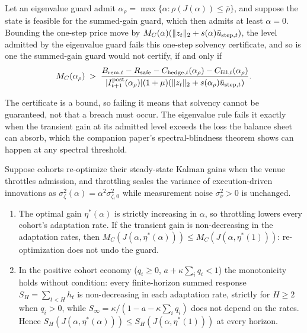 \begin{proposition}\label{prop:dominance}
Let an eigenvalue guard admit $\alpha_\rho=\max\{\alpha:\rho(J(\alpha))\le\bar\rho\}$, and suppose the state is feasible for the summed-gain guard, which then admits at least $\alpha=0$. Bounding the one-step price move by $M_C(\alpha)(\|z_t\|_2+s(\alpha)\bar u_{{\rm step},t})$, the level admitted by the eigenvalue guard fails this one-step solvency certificate, and so is one the summed-gain guard would not certify, if and only if
\[
M_C(\alpha_\rho)\;>\;\frac{B_{{\rm rem},t}-R_{\rm safe}-C_{{\rm hedge},t}(\alpha_\rho)-C_{{\rm fill},t}(\alpha_\rho)}{|I^{\rm post}_{t+1}(\alpha_\rho)|(1+\mu)(\|z_t\|_2+s(\alpha_\rho)\bar u_{{\rm step},t})} .
\]
\end{proposition}

The certificate is a bound, so failing it means that solvency cannot be guaranteed, not that a breach must occur. The eigenvalue rule fails it exactly when the transient gain at its admitted level exceeds the loss the balance sheet can absorb, which the companion paper's spectral-blindness theorem shows can happen at any spectral threshold.

\begin{proposition}\label{prop:lucas}
Suppose cohorts re-optimize their steady-state Kalman gains when the venue throttles admission, and throttling scales the variance of execution-driven innovations as $\sigma_\zeta^2(\alpha)=\alpha^2\sigma_{\zeta,0}^2$ while measurement noise $\sigma_\nu^2>0$ is unchanged.
\begin{enumerate}[label=(\roman*)]
\item The optimal gain $\eta^*(\alpha)$ is strictly increasing in $\alpha$, so throttling lowers every cohort's adaptation rate. If the transient gain is non-decreasing in the adaptation rates, then $M_C(J(\alpha,\eta^*(\alpha)))\le M_C(J(\alpha,\eta^*(1)))$: re-optimization does not undo the guard.
\item In the positive cohort economy ($q_i\ge0$, $a+\kappa\sum_iq_i<1$) the monotonicity holds without condition: every finite-horizon summed response $S_H=\sum_{t<H}h_t$ is non-decreasing in each adaptation rate, strictly for $H\ge2$ when $q_i>0$, while $S_\infty=\kappa/(1-a-\kappa\sum_iq_i)$ does not depend on the rates. Hence $S_H(J(\alpha,\eta^*(\alpha)))\le S_H(J(\alpha,\eta^*(1)))$ at every horizon.
\end{enumerate}
\end{proposition}

